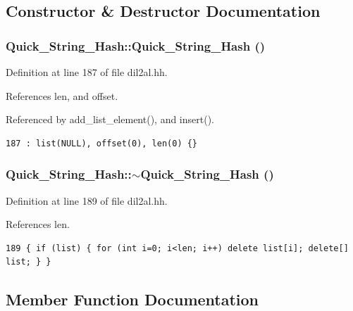 \subsection{Constructor \& Destructor Documentation}
\subsubsection{\setlength{\rightskip}{0pt plus 5cm}Quick\_\-String\_\-Hash::Quick\_\-String\_\-Hash ()\hspace{0.3cm}{\tt  [inline]}}\label{classQuick__String__Hash_a0}




Definition at line 187 of file dil2al.hh.

References len, and offset.

Referenced by add\_\-list\_\-element(), and insert().



\footnotesize\begin{verbatim}187 : list(NULL), offset(0), len(0) {}
\end{verbatim}\normalsize 
{}
\subsubsection{\setlength{\rightskip}{0pt plus 5cm}Quick\_\-String\_\-Hash::$\sim$Quick\_\-String\_\-Hash ()\hspace{0.3cm}{\tt  [inline]}}\label{classQuick__String__Hash_a1}




Definition at line 189 of file dil2al.hh.

References len.



\footnotesize\begin{verbatim}189 { if (list) { for (int i=0; i<len; i++) delete list[i]; delete[] list; } }
\end{verbatim}\normalsize 


\subsection{Member Function Documentation}
